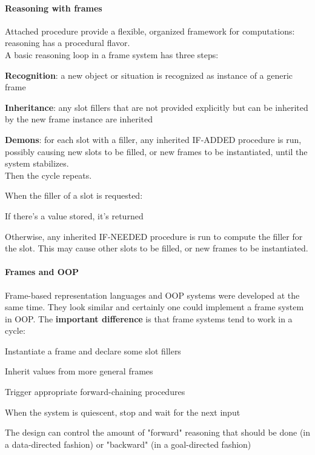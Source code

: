 \documentclass[10pt]{report}
\begin{document}
\paragraph{Reasoning with frames} Attached procedure provide a flexible, organized framework for computations: reasoning has a procedural flavor.\\
A basic reasoning loop in a frame system has three steps:
\begin{list}{}{}
	\item \textbf{Recognition}: a new object or situation is recognized as instance of a generic frame
	\item \textbf{Inheritance}: any slot fillers that are not provided explicitly but can be inherited by the new frame instance are inherited
	\item \textbf{Demons}: for each slot with a filler, any inherited IF-ADDED procedure is run, possibly causing new slots to be filled, or new frames to be instantiated, until the system stabilizes.\\
	Then the cycle repeats.
\end{list}
When the filler of a slot is requested:
\begin{list}{}{}
	\item If there's a value stored, it's returned
	\item Otherwise, any inherited IF-NEEDED procedure is run to compute the filler for the slot. This may cause other slots to be filled, or new frames to be instantiated.
\end{list}
\paragraph{Frames and OOP} Frame-based representation languages and OOP systems were developed at the same time. They look similar and certainly one could implement a frame system in OOP. The \textbf{important difference} is that frame systems tend to work in a cycle:
\begin{list}{}{}
	\item Instantiate a frame and declare some slot fillers
	\item Inherit values from more general frames
	\item Trigger appropriate forward-chaining procedures
	\item When the system is quiescent, stop and wait for the next input
\end{list}
The design can control the amount of "forward" reasoning that should be done (in a data-directed fashion) or "backward" (in a goal-directed fashion)
\end{document}
